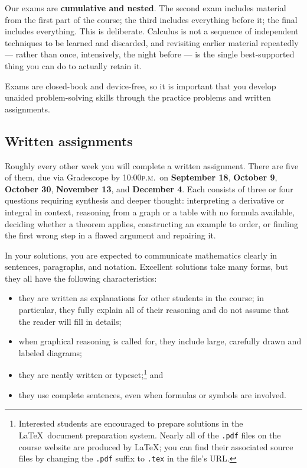 \documentclass[11pt,twoside]{amsart}
\begin{document}
Our exams are \textbf{cumulative and nested}. The second exam includes material from the first part of the course; the third includes everything before it; the final includes everything. This is deliberate. Calculus is not a sequence of independent techniques to be learned and discarded, and revisiting earlier material repeatedly --- rather than once, intensively, the night before --- is the single best-supported thing you can do to actually retain it.

Exams are closed-book and device-free, so it is important that you develop unaided problem-solving skills through the practice problems and written assignments.

\subsection*{Written assignments}\label{hw}
Roughly every other week you will complete a written assignment. There are five of them, due via Gradescope by 10:00\textsc{p.m.}~on \textbf{September 18}, \textbf{October 9}, \textbf{October 30}, \textbf{November 13}, and \textbf{December 4}. Each consists of three or four questions requiring synthesis and deeper thought: interpreting a derivative or integral in context, reasoning from a graph or a table with no formula available, deciding whether a theorem applies, constructing an example to order, or finding the first wrong step in a flawed argument and repairing it.

In your solutions, you are expected to communicate mathematics clearly in sentences, paragraphs, and notation. Excellent solutions take many forms, but they all have the following characteristics:
\begin{itemize}
\item they are written as explanations for other students in the course; in particular, they fully explain all of their reasoning and do not assume that the reader will fill in details;
\item when graphical reasoning is called for, they include large, carefully drawn and labeled diagrams;
\item they are neatly written or typeset;\footnote{Interested students are
encouraged to prepare solutions in the \LaTeX~document preparation
system.  Nearly all of the \texttt{.pdf} files on the course website are produced by \LaTeX; you can find their associated source files by changing the \texttt{.pdf} suffix to \texttt{.tex} in the file's URL.} and
\item they use complete sentences, even when formulas or symbols are involved.
\end{itemize}
\end{document}
